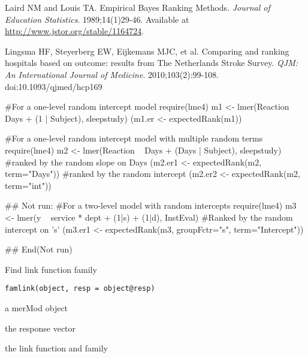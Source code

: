 \documentclass[letterpaper]{book}
\begin{document}
%
\begin{References}\relax
Laird NM and Louis TA. Empirical Bayes Ranking Methods. \emph{Journal of
Education Statistics}. 1989;14(1)29-46. Available at
\url{http://www.jstor.org/stable/1164724}.


Lingsma HF, Steyerberg EW, Eijkemans MJC, et al. Comparing and
ranking hospitals based on outcome: results from The Netherlands Stroke Survey.
\emph{QJM: An International Journal of Medicine}. 2010;103(2):99-108.
doi:10.1093/qjmed/hcp169
\end{References}
%
\begin{Examples}
\begin{ExampleCode}
#For a one-level random intercept model
require(lme4)
m1 <- lmer(Reaction ~ Days + (1 | Subject), sleepstudy)
(m1.er <- expectedRank(m1))

#For a one-level random intercept model with multiple random terms
require(lme4)
m2 <- lmer(Reaction ~ Days + (Days | Subject), sleepstudy)
#ranked by the random slope on Days
(m2.er1 <- expectedRank(m2, term="Days"))
#ranked by the random intercept
(m2.er2 <- expectedRank(m2, term="int"))

## Not run: 
#For a two-level model with random intercepts
require(lme4)
m3 <- lmer(y ~ service * dept + (1|s) + (1|d), InstEval)
#Ranked by the random intercept on 's'
(m3.er1 <- expectedRank(m3, groupFctr="s", term="Intercept"))

## End(Not run)
\end{ExampleCode}
\end{Examples}
%
\begin{Description}\relax
Find link function family
\end{Description}
%
\begin{Usage}
\begin{verbatim}
famlink(object, resp = object@resp)
\end{verbatim}
\end{Usage}
%
\begin{Arguments}
\begin{ldescription}
\item[\code{object}] a merMod object

\item[\code{resp}] the response vector
\end{ldescription}
\end{Arguments}
%
\begin{Value}
the link function and family
\end{Value}
\end{document}
